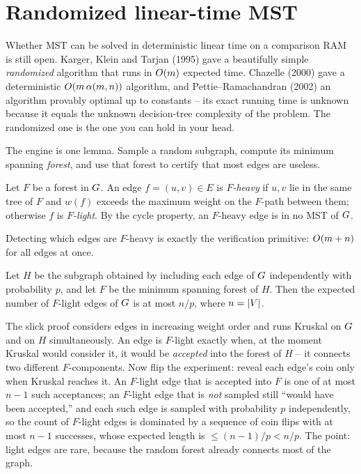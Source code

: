 \section{Randomized linear-time MST}
\label{ch06:linear}

\begin{historybox}
Whether MST can be solved in deterministic linear time on a comparison RAM is still open. Karger, Klein and Tarjan (1995) gave a beautifully simple \emph{randomized} algorithm that runs in $O(m)$ expected time. Chazelle (2000) gave a deterministic $O(m\,\alpha(m,n))$ algorithm, and Pettie--Ramachandran (2002) an algorithm provably optimal up to constants -- its exact running time is unknown because it equals the unknown decision-tree complexity of the problem. The randomized one is the one you can hold in your head.
\end{historybox}

The engine is one lemma. Sample a random subgraph, compute its minimum spanning \emph{forest}, and use that forest to certify that most edges are useless.

\begin{definition}
Let $F$ be a forest in $G$. An edge $f=(u,v)\in E$ is \emph{$F$-heavy} if $u,v$ lie in the same tree of $F$ and $w(f)$ exceeds the maximum weight on the $F$-path between them; otherwise $f$ is \emph{$F$-light}. By the cycle property, an $F$-heavy edge is in no MST of $G$.
\end{definition}

Detecting which edges are $F$-heavy is exactly the verification primitive: $O(m+n)$ for all edges at once.

\begin{lemma}
\label{ch06:sampling}
Let $H$ be the subgraph obtained by including each edge of $G$ independently with probability $p$, and let $F$ be the minimum spanning forest of $H$. Then the expected number of $F$-light edges of $G$ is at most $n/p$, where $n=\lvert V\rvert$.
\end{lemma}

\begin{whybox}
The slick proof considers edges in increasing weight order and runs Kruskal on $G$ and on $H$ simultaneously. An edge is $F$-light exactly when, at the moment Kruskal would consider it, it would be \emph{accepted} into the forest of $H$ -- it connects two different $F$-components. Now flip the experiment: reveal each edge's coin only when Kruskal reaches it. An $F$-light edge that is accepted into $F$ is one of at most $n-1$ such acceptances; an $F$-light edge that is \emph{not} sampled still ``would have been accepted,'' and each such edge is sampled with probability $p$ independently, so the count of $F$-light edges is dominated by a sequence of coin flips with at most $n-1$ successes, whose expected length is $\le (n-1)/p < n/p$. The point: light edges are rare, because the random forest already connects most of the graph.
\end{whybox}

